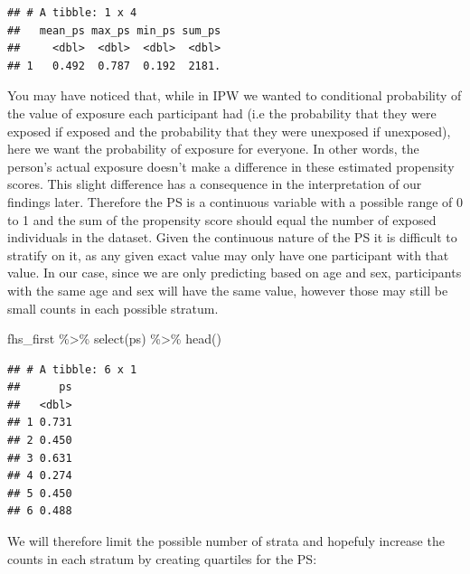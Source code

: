 \documentclass[
]{book}
\newenvironment{Shaded}{\begin{snugshade}}{\end{snugshade}}
\newcommand{\FunctionTok}[1]{\textcolor[rgb]{0.00,0.00,0.00}{#1}}
\newcommand{\NormalTok}[1]{#1}
\newcommand{\SpecialCharTok}[1]{\textcolor[rgb]{0.00,0.00,0.00}{#1}}
\begin{document}
\begin{verbatim}
## # A tibble: 1 x 4
##   mean_ps max_ps min_ps sum_ps
##     <dbl>  <dbl>  <dbl>  <dbl>
## 1   0.492  0.787  0.192  2181.
\end{verbatim}

You may have noticed that, while in IPW we wanted to conditional probability of the value of exposure each participant had (i.e the probability that they were exposed if exposed and the probability that they were unexposed if unexposed), here we want the probability of exposure for everyone. In other words, the person's actual exposure doesn't make a difference in these estimated propensity scores. This slight difference has a consequence in the interpretation of our findings later. Therefore the PS is a continuous variable with a possible range of 0 to 1 and the sum of the propensity score should equal the number of exposed individuals in the dataset. Given the continuous nature of the PS it is difficult to stratify on it, as any given exact value may only have one participant with that value. In our case, since we are only predicting based on age and sex, participants with the same age and sex will have the same value, however those may still be small counts in each possible stratum.

\begin{Shaded}
\begin{Highlighting}[]
\NormalTok{fhs\_first }\SpecialCharTok{\%\textgreater{}\%}
  \FunctionTok{select}\NormalTok{(ps) }\SpecialCharTok{\%\textgreater{}\%}
  \FunctionTok{head}\NormalTok{()}
\end{Highlighting}
\end{Shaded}

\begin{verbatim}
## # A tibble: 6 x 1
##      ps
##   <dbl>
## 1 0.731
## 2 0.450
## 3 0.631
## 4 0.274
## 5 0.450
## 6 0.488
\end{verbatim}

We will therefore limit the possible number of strata and hopefuly increase the counts in each stratum by creating quartiles for the PS:
\end{document}
